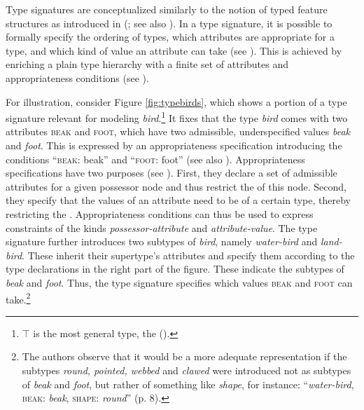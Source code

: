 Type signatures are conceptualized similarly to the notion of typed feature structures as introduced in \citeauthor{Carpenter.1992} (\citeyear{Carpenter.1992}; see also \citealt[163--164]{Petersen.2007}). 
In a type signature, it is possible to formally specify the ordering of types, which attributes are appropriate for a type, and which kind of value an attribute can take (see \citealt[7]{Gamerschlag.2014a}). This is achieved by enriching a plain type hierarchy with a finite set of attributes and appropriateness conditions (see \citealt[163--164]{Petersen.2007}).\largerpage

For illustration, consider Figure \ref{fig:typebirds}, which shows a portion of a type signature relevant for modeling \textit{bird}.\footnote{$\top$ is the most general type, the  (\citealt[153]{McGlashan.1992}).}
It fixes that the type \textit{bird} comes with two attributes \textsc{beak} and \textsc{foot}, which have two admissible, underspecified values \textit{beak} and \textit{foot}. This is expressed by an appropriateness specification introducing the conditions ``\textsc{beak}: beak'' and ``\textsc{foot}: foot'' (see also \citealt[163, 165]{Petersen.2007}). 
Appropriateness specifications have two purposes (see \citealt{Petersen.2014}). First, they declare a set of admissible attributes for a given possessor node and thus restrict the  of this node.
Second, they specify that the values of an attribute need to be of a certain type, thereby restricting the . 
Appropriateness conditions can thus be used to express constraints of the kinds \textit{possessor-attribute} and \textit{attribute-value}. 
The type signature further introduces two subtypes of \textit{bird}, namely \textit{water-bird} and \textit{land-bird}. These inherit their supertype's attributes and specify them according to the type declarations in the right part of the figure. These indicate the subtypes of \textit{beak} and \textit{foot}. Thus, the type signature specifies which values \textsc{beak} and \textsc{foot} can take.{\footnote{The authors observe that it would be a more adequate representation if the subtypes \textit{round, pointed, webbed} and \textit{clawed} were introduced not as subtypes of \textit{beak} and \textit{foot}, but rather of something like \textit{shape}, for instance: ``\textit{water-bird}, \textsc{beak}: \textit{beak}, \textsc{shape}: \textit{round}'' (p. 8).}}  


